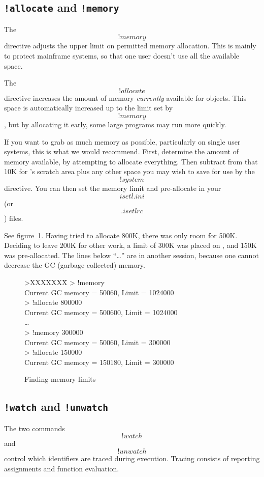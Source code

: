 {\pagebreak[0]
\subsection{{\tt !allocate} and {\tt !memory}}
\label{allocate}
    The \[!memory\] directive adjusts the upper limit on permitted
    memory allocation.
    This is mainly to protect mainframe systems, so that one user
    doesn't use all the available space.

    The \[!allocate\] directive increases the amount of memory
    {\em currently\/} available for \ISETL{} objects.
    This space is automatically increased up to the limit set by
    \[!memory\], but by allocating it early, some large programs may
    run more quickly.

    If you want to grab as much memory as possible, particularly on
    single user systems, this is what we would recommend.
    First, determine the amount of memory available, by attempting to
    allocate everything.
    Then subtract from that 10K for \ISETL{}'s scratch area plus any
    other space you may wish to save for use by the \[!system\]
    directive.
    You can then set the memory limit and pre-allocate in your
    \[isetl.ini\] (or \[.isetlrc\]) files.

    See figure~\ref{space}.
    Having tried to allocate 800K, there was only room for 500K\@.
    Deciding to leave 200K for other work, a limit of 300K was placed
    on \ISETL{}, and 150K was pre-allocated.
    The lines below ``\ldots'' are in another session,
    because one cannot decrease the GC (garbage collected) memory.


    \begin{figure}[hbp]
	\DS
	>XXXXXXX\=\kill
	>	\>!memory\\
	Current GC memory = 50060, Limit = 1024000\\
	>	\>!allocate 800000\\
	Current GC memory = 500600, Limit = 1024000\\
	\ldots\\
	>	\>!memory 300000\\
	Current GC memory = 50060, Limit = 300000\\
	>	\>!allocate 150000\\
	Current GC memory = 150180, Limit = 300000
	\DE
	\caption{Finding memory limits}\label{space}
    \end{figure}

\pagebreak[0]
\subsection{{\tt !watch} and {\tt !unwatch}}
    The two commands \[!watch\] and \[!unwatch\] control which
    identifiers are traced during execution.
    Tracing consists of reporting assignments and function evaluation.

}
